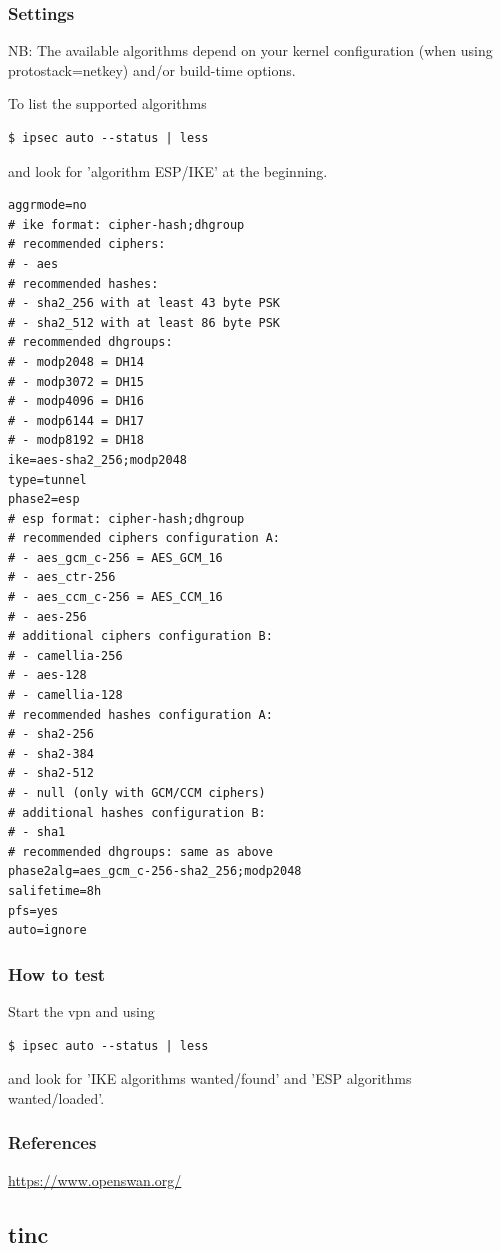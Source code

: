 \subsubsection{Settings}
NB: The available algorithms depend on your kernel configuration (when using protostack=netkey) and/or
build-time options.

To list the supported algorithms
\begin{lstlisting}
$ ipsec auto --status | less
\end{lstlisting}
and look for 'algorithm ESP/IKE' at the beginning.

\begin{lstlisting}
aggrmode=no
# ike format: cipher-hash;dhgroup
# recommended ciphers:
# - aes
# recommended hashes:
# - sha2_256 with at least 43 byte PSK
# - sha2_512 with at least 86 byte PSK
# recommended dhgroups:
# - modp2048 = DH14
# - modp3072 = DH15
# - modp4096 = DH16
# - modp6144 = DH17
# - modp8192 = DH18
ike=aes-sha2_256;modp2048
type=tunnel
phase2=esp
# esp format: cipher-hash;dhgroup
# recommended ciphers configuration A:
# - aes_gcm_c-256 = AES_GCM_16
# - aes_ctr-256
# - aes_ccm_c-256 = AES_CCM_16
# - aes-256 
# additional ciphers configuration B:
# - camellia-256
# - aes-128
# - camellia-128
# recommended hashes configuration A:
# - sha2-256
# - sha2-384
# - sha2-512
# - null (only with GCM/CCM ciphers)
# additional hashes configuration B:
# - sha1
# recommended dhgroups: same as above
phase2alg=aes_gcm_c-256-sha2_256;modp2048
salifetime=8h
pfs=yes
auto=ignore
\end{lstlisting}

\subsubsection{How to test}
Start the vpn and using
\begin{lstlisting}
$ ipsec auto --status | less
\end{lstlisting}
and look for 'IKE algorithms wanted/found' and 'ESP algorithms wanted/loaded'.

\subsubsection{References}
\begin{itemize*}
  \item \url{https://www.openswan.org/}
\end{itemize*}


\subsection{tinc}
